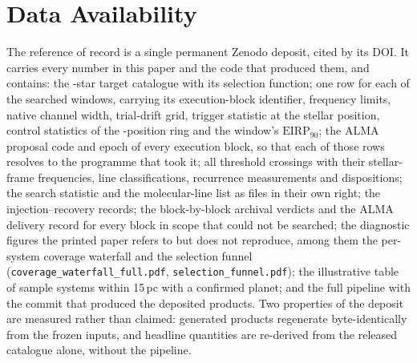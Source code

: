 \section*{Data Availability}
\label{sec:data}
The reference of record is a single permanent Zenodo deposit, cited by its
DOI. It carries every number in this paper and the code that produced them,
and contains: the \NStars-star target catalogue with its selection
function; one row for each of the \NWindows{} searched windows, carrying
its execution-block identifier, frequency limits,
native channel width, trial-drift grid, trigger statistic at the stellar
position, control statistics of the \NCtrl-position ring and the window's
$\mathrm{EIRP}_{90}$; the ALMA proposal code and epoch of every execution
block, so that each of those rows resolves to the programme that took it;
all \EvNCrossRaw{} threshold crossings with their
stellar-frame frequencies, line classifications, recurrence measurements
and dispositions; the search statistic and the molecular-line list as files
in their own right; the injection--recovery records; the block-by-block
archival verdicts and the ALMA delivery record for every block in scope
that could not be searched; the diagnostic figures the printed paper refers
to but does not reproduce, among them the per-system coverage waterfall and
the selection funnel (\texttt{coverage\_waterfall\_full.pdf},
\texttt{selection\_funnel.pdf}); the illustrative table of sample systems
within 15\,pc with a confirmed planet; and the full pipeline with the
commit that produced the deposited products. Two properties of the deposit are
measured rather than claimed: \NRegenProducts{} generated products
regenerate byte-identically from the frozen inputs, and \NReproChecks{}
headline quantities are re-derived from the released catalogue alone,
without the pipeline.

